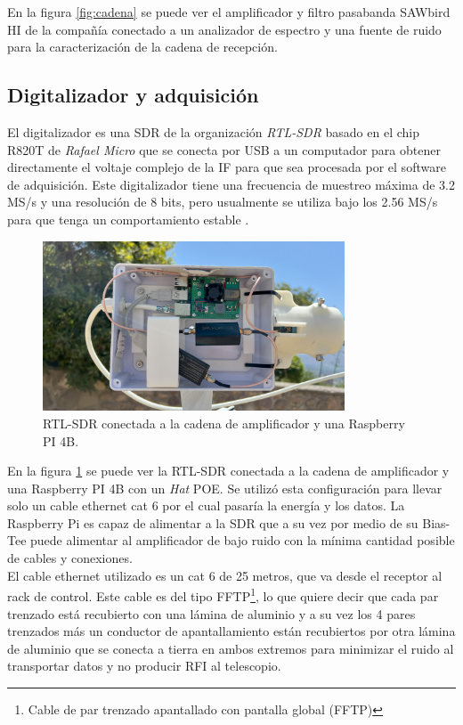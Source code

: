 En la figura \ref{fig:cadena} se puede ver el amplificador y filtro pasabanda SAWbird HI de la compañía conectado a un analizador de espectro y una fuente de ruido para la caracterización de la cadena de recepción.\\

\subsection{Digitalizador y adquisición}

El digitalizador es una SDR de la organización \textit{RTL-SDR} basado en el chip R820T de \textit{Rafael Micro} que se conecta por USB a un computador para obtener directamente el voltaje complejo de la IF para que sea procesada por el software de adquisición. Este digitalizador tiene una frecuencia de muestreo máxima de 3.2 MS/s y una resolución de 8 bits, pero usualmente se utiliza bajo los 2.56 MS/s para que tenga un comportamiento estable \cite{RTLSDR2018}.\\

\begin{figure}
    \centering
    \includegraphics[width=0.8\textwidth]{img/rpiRtlSaw}
    \caption{RTL-SDR conectada a la cadena de amplificador y una Raspberry PI 4B.}
    \label{fig:digitalizador}
\end{figure}

En la figura \ref{fig:digitalizador} se puede ver la RTL-SDR conectada a la cadena de amplificador y una Raspberry PI 4B con un \textit{Hat} POE. Se utilizó esta configuración para llevar solo un cable ethernet cat 6 por el cual pasaría la energía y los datos. La Raspberry Pi es capaz de alimentar a la SDR que a su vez por medio de su Bias-Tee puede alimentar al amplificador de bajo ruido con la mínima cantidad posible de cables y conexiones.\\

El cable ethernet utilizado es un cat 6 de 25 metros, que va desde el receptor al rack de control. Este cable es del tipo FFTP\footnote{Cable de par trenzado apantallado con pantalla global (FFTP)}, lo que quiere decir que cada par trenzado está recubierto con una lámina de aluminio y a su vez los 4 pares trenzados más un conductor de apantallamiento están recubiertos por otra lámina de aluminio que se conecta a tierra en ambos extremos para minimizar el ruido al transportar datos y no producir RFI al telescopio.\\

